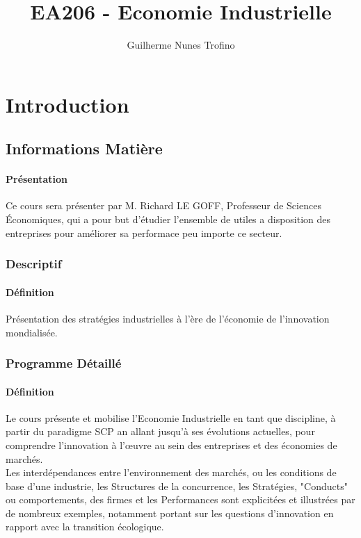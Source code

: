 \documentclass{article}
\title{EA206 - Economie Industrielle}
\author{Guilherme Nunes Trofino}
\begin{document}
\maketitle


\newpage\tableofcontents

\section{Introduction}



\subsection{Informations Matière}
\paragraph{Présentation}Ce cours sera présenter par M. Richard LE GOFF, Professeur de Sciences Économiques, qui a pour but d'étudier l'ensemble de utiles a disposition des entreprises pour améliorer sa performace peu importe ce secteur.

\subsubsection{Descriptif}
\paragraph{Définition}Présentation des stratégies industrielles à l'ère de l'économie de l'innovation mondialisée.

\subsubsection{Programme Détaillé}
\paragraph{Définition}Le cours présente et mobilise l'Economie Industrielle en tant que discipline, à partir du paradigme SCP an allant jusqu'à ses évolutions actuelles, pour comprendre l'innovation à l'œuvre au sein des entreprises et des économies de marchés.\\

\noindent Les interdépendances entre l'environnement des marchés, ou les conditions de base d'une industrie, les Structures de la concurrence, les Stratégies, "Conducts" ou comportements, des firmes et les Performances sont explicitées et illustrées par de nombreux exemples, notamment portant sur les questions d'innovation en rapport avec la transition écologique.
\end{document}
